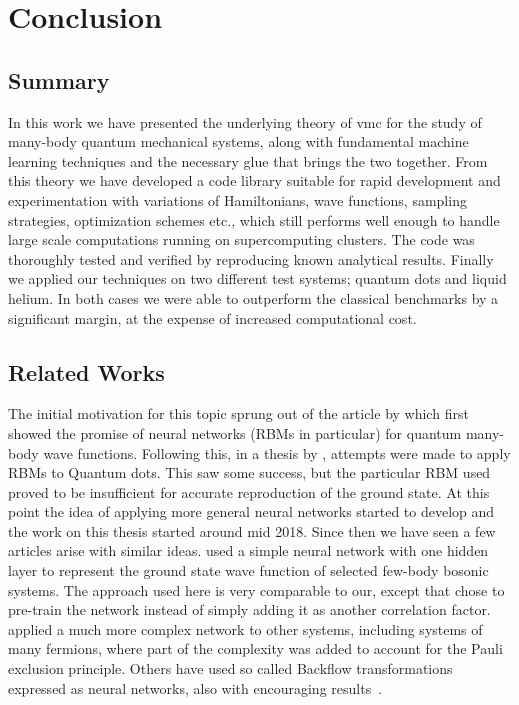 \documentclass[Thesis.tex]{subfiles}
\begin{document}
\chapter{Conclusion}
\label{chp:conclusion}

\section{Summary}

In this work we have presented the underlying theory of \gls{vmc}
for the study of many-body quantum mechanical systems, along
with fundamental machine learning techniques and the necessary glue that
brings the two together. From this theory we have developed a code
library suitable for rapid development and experimentation with
variations of Hamiltonians, wave functions, sampling strategies,
optimization schemes etc., which still performs well enough to
handle large scale computations running on supercomputing clusters. The
code was thoroughly tested and verified by reproducing known analytical
results. Finally we applied our techniques on two different test
systems; quantum dots and liquid helium. In both cases we were able to
outperform the classical benchmarks by a significant margin, at the
expense of increased computational cost.


\section{Related Works}

The initial motivation for this topic sprung out of the article by
\textcite{Carleo602} which first showed the promise of neural networks (RBMs in
particular) for quantum many-body wave functions. Following this, in a thesis by
\textcite{Flugsrud-2018}, attempts were made to apply RBMs to Quantum dots. This
saw some success, but the particular RBM used proved to be insufficient for
accurate reproduction of the ground state. At this point the idea of applying
more general neural networks started to develop and the work on this thesis
started around mid 2018. Since then we have seen a few articles arise with
similar ideas. \textcite{Saito-2018} used a simple neural network with one
hidden layer to represent the ground state wave function of
selected few-body bosonic systems. The approach used here is very comparable to our,
except that \citeauthor{Saito-2018} chose to pre-train the network instead of
simply adding it as another correlation factor. \textcite{Han-2018} applied a
much more complex network to other systems, including systems of many fermions,
where part of the complexity was added to account for the Pauli exclusion
principle. Others have used so called Backflow transformations expressed as
neural networks, also with encouraging results~\cite{ruggeri2018,Luo-2019}.
\end{document}
